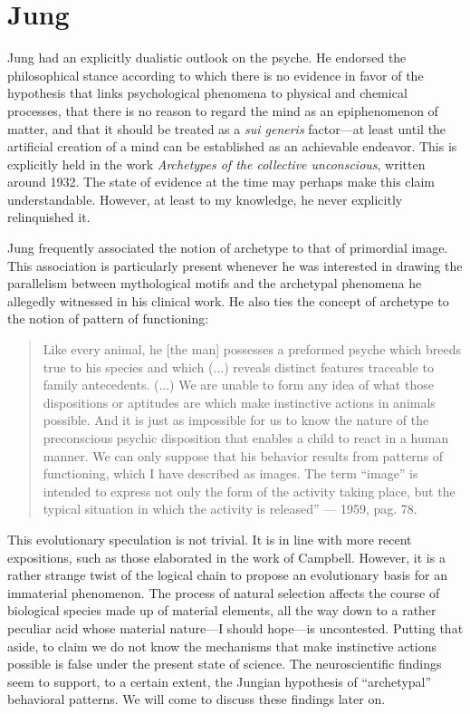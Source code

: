 \documentclass[a4paper]{article}
\begin{document}
    \section{Jung}

    Jung had an explicitly dualistic outlook on the psyche. He endorsed
    the philosophical stance according to which there is no evidence in favor of
    the hypothesis that links psychological phenomena to physical and chemical
    processes, that there is no reason to regard the mind as an epiphenomenon of
    matter, and that it should be treated as a \textit{sui generis} factor—at least
    until the artificial creation of a mind can be established as an achievable
    endeavor. This is explicitly held in the work \textit{Archetypes of the collective
    unconscious}, written around 1932. The state of evidence at the time may
    perhaps make this claim understandable. However, at least to my
    knowledge, he never explicitly relinquished it. 

    Jung frequently associated
    the notion of archetype to that of primordial image. This association is
    particularly present whenever he was interested in drawing the parallelism
    between mythological motifs and the archetypal phenomena he allegedly
    witnessed in his clinical work. He also ties the concept of archetype to the
    notion of pattern of functioning: 

    \begin{quote}
    Like every animal, he [the man] possesses
    a preformed psyche which breeds true to his species and which (...) reveals
    distinct features traceable to family antecedents. (...) We are unable to
    form any idea of what those dispositions or aptitudes are which make
    instinctive actions in animals possible. And it is just as impossible for us
    to know the nature of the preconscious psychic disposition that enables a
    child to react in a human manner. We can only suppose that his behavior
    results from patterns of functioning, which I have described as images. The
    term “image” is intended to express not only the form of the activity taking
    place, but the typical situation in which the activity is released” — 1959,
    pag. 78. 
    \end{quote}

    This evolutionary speculation is not trivial. It is in line with
    more recent expositions, such as those elaborated in the work of Campbell.
    However, it is a rather strange twist of the logical chain to propose an
    evolutionary basis for an immaterial phenomenon. The process of natural
    selection affects the course of biological species made up of material
    elements, all the way down to a rather peculiar acid whose material nature—I
    should hope—is uncontested. Putting that aside, to claim we do not know the
    mechanisms that make instinctive actions possible is false under the present
    state of science. The neuroscientific findings seem to support, to a
    certain extent, the Jungian hypothesis of “archetypal” behavioral patterns.
    We will come to discuss these findings later on. 
\end{document}
